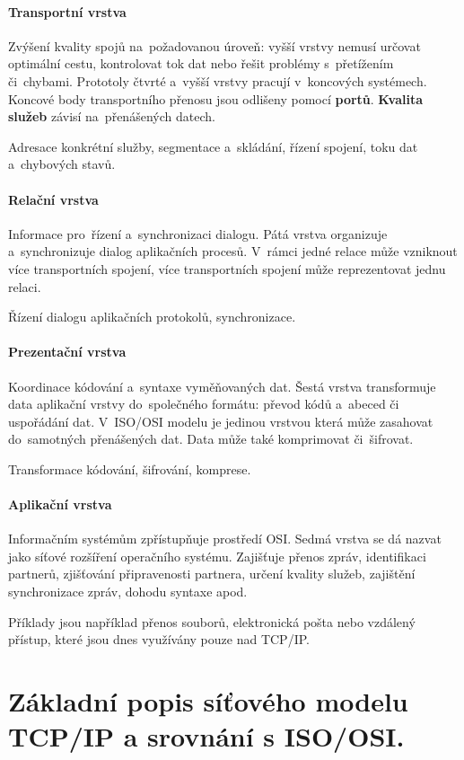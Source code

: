 \paragraph{Transportní vrstva} Zvýšení kvality spojů na~požadovanou úroveň: vyšší vrstvy nemusí určovat optimální cestu, kontrolovat tok dat nebo řešit problémy s~přetížením či~chybami. Prototoly čtvrté a~vyšší vrstvy pracují v~koncových systémech. Koncové body transportního přenosu jsou odlišeny pomocí \textbf{portů}. \textbf{Kvalita služeb} závisí na~přenášených datech.

Adresace konkrétní služby, segmentace a~skládání, řízení spojení, toku dat a~chybových stavů.

\paragraph{Relační vrstva} Informace pro~řízení a~synchronizaci dialogu. Pátá vrstva organizuje a~synchronizuje dialog aplikačních procesů. V~rámci jedné relace může vzniknout více transportních spojení, více transportních spojení může reprezentovat jednu relaci.

Řízení dialogu aplikačních protokolů, synchronizace.

\paragraph{Prezentační vrstva} Koordinace kódování a~syntaxe vyměňovaných dat. Šestá vrstva transformuje data aplikační vrstvy do~společného formátu: převod kódů a~abeced či uspořádání dat. V~ISO/OSI modelu je jedinou vrstvou která může zasahovat do~samotných přenášených dat. Data může také komprimovat či~šifrovat.

Transformace kódování, šifrování, komprese.

\paragraph{Aplikační vrstva} Informačním systémům zpřístupňuje prostředí OSI. Sedmá vrstva se dá nazvat jako síťové rozšíření operačního systému. Zajišťuje přenos zpráv, identifikaci partnerů, zjišťování připravenosti partnera, určení kvality služeb, zajištění synchronizace zpráv, dohodu syntaxe apod.

Příklady jsou například přenos souborů, elektronická pošta nebo vzdálený přístup, které jsou dnes využívány pouze nad TCP/IP.

\clearpage
\section{Základní popis síťového modelu TCP/IP a srovnání s ISO/OSI.}

